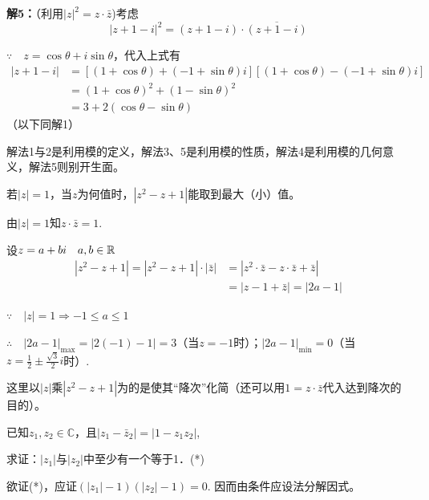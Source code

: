 \begin{solution}
\begin{minipage}{.4\textwidth}
\begin{tikzpicture}[>=stealth, scale=1.5]
\end{tikzpicture}
\end{minipage}

\textbf{解5：}（利用$|z|^2=z\cdot \bar z$)考虑
\[|z+1-i|^2=(z+1-i)\cdot \overline{(z+1-i)}\]

$\because\quad z=\cos\theta+i\sin\theta$，代入上式有
\[\begin{split}
|z+1-i|&=[(1+\cos\theta)+(-1+\sin\theta)i][(1+\cos\theta)-(-1+\sin\theta)i]\\
&=(1+\cos\theta)^2+(1-\sin\theta)^2\\
&=3+2(\cos\theta-\sin\theta)    
\end{split}\]
（以下同解1）
\end{solution}

\begin{rmk}
    解法1与2是利用模的定义，解法3、5是利用模的性质，解法4是利用模的几何意义，解法5则别开生面。
\end{rmk}

\begin{example}
    若$|z|=1$，当$z$为何值时，$|z^2-z+1|$能取到最大（小）值。
\end{example}

\begin{solution}
由$|z|=1$知$z\cdot \bar z=1$.

设$z=a+bi\quad a,b\in\mathbb{R}$
\[\begin{split}
    |z^2-z+1|=|z^2-z+1|\cdot |\bar z|&=|z^2\cdot \bar z-z\cdot \bar z+\bar z|\\
    &=|z-1+\bar z|=|2a-1|
\end{split}\]

$\because\quad |z|=1\Rightarrow -1\le a\le 1$

$\therefore\quad |2a-1|_{\max}=|2(-1)-1|=3$（当$z=-1$时）；$|2a-1|_{\min}=0$（当$z=\frac{1}{2}\pm\frac{\sqrt{3}}{2}i$时）.
\end{solution}

\begin{rmk}
    这里以$|z|$乘$|z^2-z+1|$为的是使其“降次”化简（还可以用$1=z\cdot \bar z$代入达到降次的目的）。
\end{rmk}

\begin{example}
    已知$z_1,z_2\in\mathbb{C}$，且$|z_1-\bar z_2|=|1-z_1z_2|$,

求证：$|z_1|$与$|z_2|$中至少有一个等于1．\hfill (*)
\end{example}

\begin{analyze}
    欲证(*)，应证$(|z_1|-1)(|z_2|-1)=0$. 因而由条件应设法分解因式。
\end{analyze}

